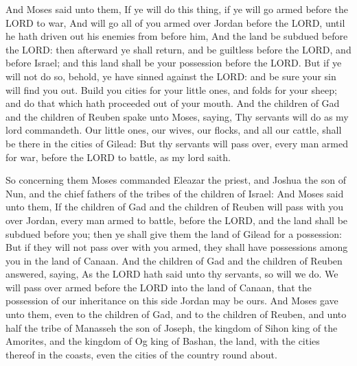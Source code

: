  And Moses said unto them, If ye will do this thing, if
ye will go armed before the LORD to war,  And will go all
of you armed over Jordan before the LORD, until he hath driven out his
enemies from before him,  And the land be subdued before
the LORD: then afterward ye shall return, and be guiltless before the
LORD, and before Israel; and this land shall be your possession before
the LORD.  But if ye will not do so, behold, ye have
sinned against the LORD: and be sure your sin will find you out.
 Build you cities for your little ones, and folds for
your sheep; and do that which hath proceeded out of your mouth.
 And the children of Gad and the children of Reuben spake
unto Moses, saying, Thy servants will do as my lord commandeth.
 Our little ones, our wives, our flocks, and all our
cattle, shall be there in the cities of Gilead:  But thy
servants will pass over, every man armed for war, before the LORD to
battle, as my lord saith.

 So concerning them Moses commanded Eleazar the priest,
and Joshua the son of Nun, and the chief fathers of the tribes of the
children of Israel:  And Moses said unto them, If the
children of Gad and the children of Reuben will pass with you over
Jordan, every man armed to battle, before the LORD, and the land shall
be subdued before you; then ye shall give them the land of Gilead for a
possession:  But if they will not pass over with you
armed, they shall have possessions among you in the land of Canaan.
 And the children of Gad and the children of Reuben
answered, saying, As the LORD hath said unto thy servants, so will we
do.  We will pass over armed before the LORD into the
land of Canaan, that the possession of our inheritance on this side
Jordan may be ours.  And Moses gave unto them, even to
the children of Gad, and to the children of Reuben, and unto half the
tribe of Manasseh the son of Joseph, the kingdom of Sihon king of the
Amorites, and the kingdom of Og king of Bashan, the land, with the
cities thereof in the coasts, even the cities of the country round
about.

